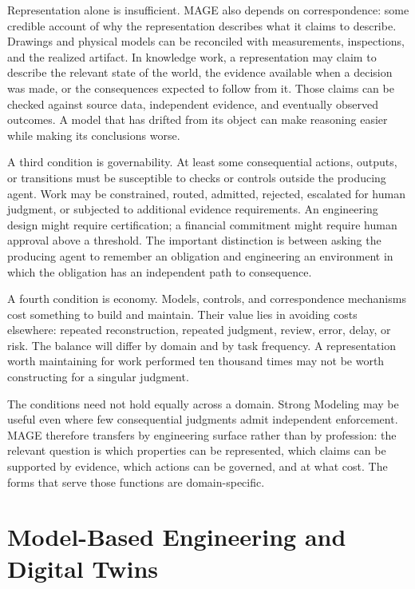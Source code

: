 Representation alone is insufficient. MAGE also depends on correspondence: some credible account of why the representation describes what it claims to describe. Drawings and physical models can be reconciled with measurements, inspections, and the realized artifact. In knowledge work, a representation may claim to describe the relevant state of the world, the evidence available when a decision was made, or the consequences expected to follow from it. Those claims can be checked against source data, independent evidence, and eventually observed outcomes. A model that has drifted from its object can make reasoning easier while making its conclusions worse.

A third condition is governability. At least some consequential actions, outputs, or transitions must be susceptible to checks or controls outside the producing agent. Work may be constrained, routed, admitted, rejected, escalated for human judgment, or subjected to additional evidence requirements. An engineering design might require certification; a financial commitment might require human approval above a threshold. The important distinction is between asking the producing agent to remember an obligation and engineering an environment in which the obligation has an independent path to consequence.

A fourth condition is economy. Models, controls, and correspondence mechanisms cost something to build and maintain. Their value lies in avoiding costs elsewhere: repeated reconstruction, repeated judgment, review, error, delay, or risk. The balance will differ by domain and by task frequency. A representation worth maintaining for work performed ten thousand times may not be worth constructing for a singular judgment.

The conditions need not hold equally across a domain. Strong Modeling may be useful even where few consequential judgments admit independent enforcement. MAGE therefore transfers by engineering surface rather than by profession: the relevant question is which properties can be represented, which claims can be supported by evidence, which actions can be governed, and at what cost. The forms that serve those functions are domain-specific.

\section{Model-Based Engineering and Digital Twins}\label{heading:model-based-engineering-and-digital-twins}


